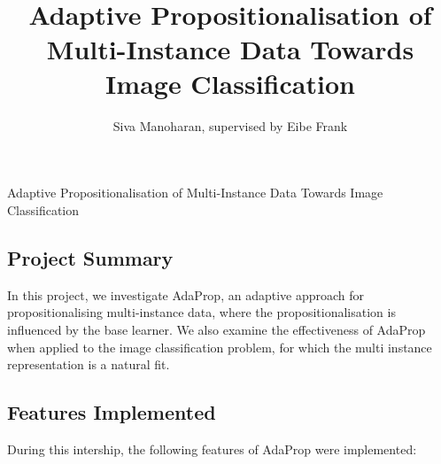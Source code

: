 \documentclass[a4paper,12pt]{article} %
\title{\ \\ \  \\ Adaptive Propositionalisation of Multi-Instance Data Towards Image Classification}
\author{Siva Manoharan, supervised by Eibe Frank}
\date{} %
\begin{document}
\onehalfspacing

{}

\begin{center}
\LARGE
Adaptive Propositionalisation of Multi-Instance Data Towards Image Classification
\end{center}


\subsection*{Project Summary}

In this project, 
    we investigate AdaProp, an
    adaptive approach for propositionalising
    multi-instance data, 
    where the propositionalisation 
    is influenced by 
    the base learner.
We also examine the effectiveness of 
    AdaProp when applied to the 
    image classification problem, 
    for which the multi instance representation
    is a natural fit.



\subsection*{Features Implemented}

During this intership, 
    the following features of AdaProp were implemented:
\end{document}
